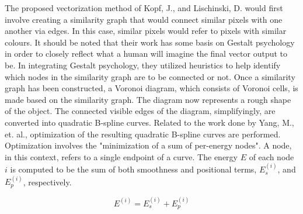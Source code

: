 The proposed vectorization method of Kopf, J., and Lischinski, D. would first involve creating a similarity graph that would connect similar pixels with one another via edges. In this case, similar pixels would refer to pixels with similar colours. It should be noted that their work has some basis on Gestalt psychology in order to closely reflect what a human will imagine the final vector output to be. In integrating Gestalt psychology, they utilized heuristics to help identify which nodes in the similarity graph are to be connected or not. Once a similarity graph has been constructed, a Voronoi diagram, which consists of Voronoi cells, is made based on the similarity graph. The diagram now represents a rough shape of the object. The connected visible edges of the diagram, simplifyingly, are converted into quadratic B-spline curves. Related to the work done by Yang, M., et. al., optimization of the resulting quadratic B-spline curves are performed. Optimization involves the "minimization of a sum of per-energy nodes". A node, in this context, refers to a single endpoint of a curve. The energy $E$ of each node $i$ is computed to be the sum of both smoothness and positional terms, $E_{s}^{(i)}$, and $E_{p}^{(i)}$, respectively.

$$ E^{(i)} = E_{s}^{(i)} + E_{p}^{(i)} $$

